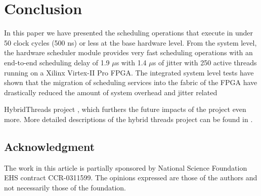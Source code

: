 \chapter{Conclusion} \label{sec:conc} In this paper we have presented the
scheduling operations that execute in under 50 clock cycles (500 ns) or less at
the base hardware level.  From the system level, the hardware scheduler module
provides very fast scheduling operations with an end-to-end scheduling delay of
1.9 ${\mu}$s with 1.4 ${\mu}$s of jitter with 250 active threads running on a
Xilinx \cite{xilinx} Virtex-II Pro FPGA.  The integrated system level tests
have shown that the migration of scheduling services into the fabric of the
FPGA have drastically reduced the amount of system overhead and jitter related

HybridThreads project \cite{Zhou:OSframe}, which furthers the future impacts of
the project even more.  More detailed descriptions of the hybrid threads
project can be found in \cite{wiki}.

\section*{Acknowledgment}

The work in this article is partially sponsored by National Science
Foundation EHS contract CCR-0311599.  The opinions expressed are those
of the authors and not necessarily those of the foundation.

